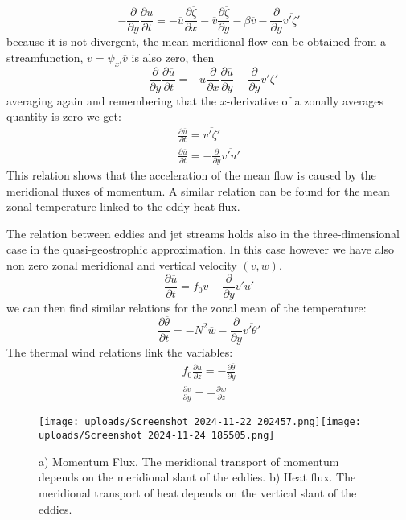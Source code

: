 $$-\frac{\partial}{\partial y}\frac{\partial\overline{u}}{\partial t}=-\overline{u}\frac{\partial\overline{\zeta}}{\partial x}-\overline{v}\frac{\partial\overline{\zeta}}{\partial y}-\beta\overline{v}-\frac{\partial}{\partial y}\overline{v'\zeta'}$$
because it is not divergent, the mean meridional flow can be obtained from a streamfunction, $v=\psi_{x'}\overline{v}$ is also zero, then
$$-\frac{\partial}{\partial y}\frac{\partial\overline{u}}{\partial t}=+\overline{u}\frac{\partial}{\partial x}\frac{\partial\overline{u}}{\partial y}-\frac{\partial}{\partial y}\overline{v'\zeta'}$$
averaging again and remembering that the $x$-derivative of a zonally averages quantity is zero we get:
\begin{align*}
	\frac{\partial\overline{u}}{\partial t}=\overline{v'\zeta'} \\
	\frac{\partial\overline{u}}{\partial t}=-\frac{\partial}{\partial y}\overline{v'u'}
\end{align*}
This relation shows that the acceleration of the mean flow is caused by the meridional fluxes of momentum. A similar relation can be found for the mean zonal temperature linked to the eddy heat flux.


The relation between eddies and jet streams holds also in the three-dimensional case in the quasi-geostrophic approximation. In this case however we have also non zero
zonal meridional and vertical velocity $(v,w)$.
$$\frac{\partial\overline{u}}{\partial t}=f_0\overline{v}-\frac{\partial}{\partial y}\overline{v'u'}$$
we can then find similar relations for the zonal mean of the temperature:
\begin{equation}\label{eq.zonal mean of temperature}
	\frac{\partial\overline{\theta}}{\partial t}=-N^2\overline{w}-\frac{\partial}{\partial y}\overline{v'\theta'}
\end{equation}
The thermal wind relations link the variables:
\begin{align}\label{eq.thermal wind}
	f_0\frac{\partial\overline{u}}{\partial z}=-\frac{\partial\overline{\theta}}{\partial y} \\
	\frac{\partial\overline{v}}{\partial y}=-\frac{\partial\overline{w}}{\partial z}
\end{align}
\begin{figure}[htpb]
	\centering
	\texttt{[image: uploads/Screenshot 2024-11-22 202457.png]}\quad \texttt{[image: uploads/Screenshot 2024-11-24 185505.png]}
	\caption{a) Momentum Flux. The meridional transport of momentum depends on the meridional slant of the eddies. b) Heat flux. The meridional transport of heat depends on the vertical slant of the eddies.}

\end{figure}
